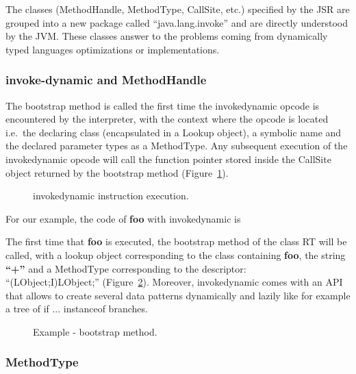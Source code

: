 \documentclass{sig-alternate}
\def \Jsr{JSR\xspace}
\def \JVM{JVM\xspace}
\begin{document}
      The classes (MethodHandle, MethodType, CallSite, etc.) specified by the \Jsr are grouped into a new
      package called ``java.lang.invoke'' and are directly understood by the \JVM.
      These classes answer to the problems coming from dynamically typed languages optimizations or implementations.

    \subsubsection{invoke-dynamic and MethodHandle}

      The bootstrap method is called the first time the invokedynamic opcode is encountered by the interpreter,
      with the context where the opcode is located i.e.~the declaring class (encapsulated in a Lookup object),
      a symbolic name and the declared parameter types as a MethodType.
      Any subsequent execution of the invokedynamic opcode will call the function pointer
      stored inside the CallSite object returned by the bootstrap method (Figure~\ref{indyFC}).

      \begin{figure}[!ht]
        \centering \resizebox{.8\linewidth}{!}{}
        \caption{invokedynamic instruction execution.}
        \label{indyFC}
      \end{figure}
      
      For our example, the code of {\bf foo} with invokedynamic is

      

      The first time that {\bf foo} is executed, the bootstrap method of the class RT will be called,
      with a lookup object corresponding to the class containing {\bf foo},
      the string {\bf ``+''} and a MethodType corresponding to the descriptor:\\``(LObject;I)LObject;'' (Figure~\ref{fooBSM}).
      Moreover, invokedynamic comes with an API that allows to create several data patterns
      dynamically and lazily like for example a tree of if ... instanceof branches.

      \begin{figure}[!ht]
        \centering \vspace{-1.5em}
        \caption{Example - bootstrap method.}
        \label{fooBSM}
      \end{figure}

    \subsubsection{MethodType}
\end{document}
